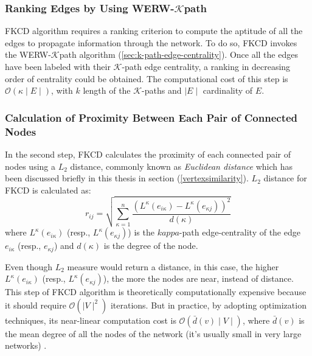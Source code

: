 {\subsubsection*{Ranking Edges by Using WERW-$\mathcal{K}$path}
FKCD algorithm requires a ranking criterion to compute the aptitude of all the edges to propagate information through the network. To do so, FKCD invokes the WERW-$\mathcal{K}$path algorithm (\ref{sec:k-path-edge-centrality}). Once all the edges have been labeled with their $\mathcal{K}$-path edge centrality, a ranking in decreasing order of centrality could be obtained. The computational cost of this step is $\mathcal{O} (\kappa \mid E \mid)$, with $k$ length of the $\mathcal{K}$-paths and $\mid E \mid$ cardinality of $E$.

\subsubsection*{Calculation of Proximity Between Each Pair of Connected Nodes}
In the second step, FKCD calculates the proximity of each connected pair of nodes using a $L_2$ distance, commonly known as \textit{Euclidean distance} which has been discussed briefly in this thesis in section (\ref{vertexsimilarity}). $L_2$ distance for FKCD is calculated as:
\begin{equation}\label{eq:node-proximity}
r_{ij} = \sqrt{\sum_{\kappa = 1}^{n} \dfrac{(L^\kappa (e_{i \kappa}) - L^\kappa (e_{\kappa j}))^2}{d(\kappa)}}
\end{equation}
where $L^\kappa(e_{i \kappa})$ (resp., $L^\kappa(e_{\kappa j})$) is the $kappa$-path edge-centrality of the edge $e_{i \kappa}$ (resp., $e_{\kappa j}$) and $d(\kappa)$ is the degree of the node.

Even though $L_2$ measure would return a distance, in this case, the higher $L^\kappa (e_{i \kappa})$ (resp., $L^\kappa (e_{\kappa j})$), the more the nodes are near, instead of distance. This step of FKCD algorithm is theoretically computationally expensive because it should require $\mathcal{O} (\mid V \mid^2)$ iterations. But in practice, by adopting optimization techniques, its near-linear computation cost is $\mathcal{O} (\bar{d}(v) \mid V \mid)$, where $\bar{d}(v)$ is the mean degree of all the nodes of the network (it's usually small in very large networks) \cite{ref-28}.

}

